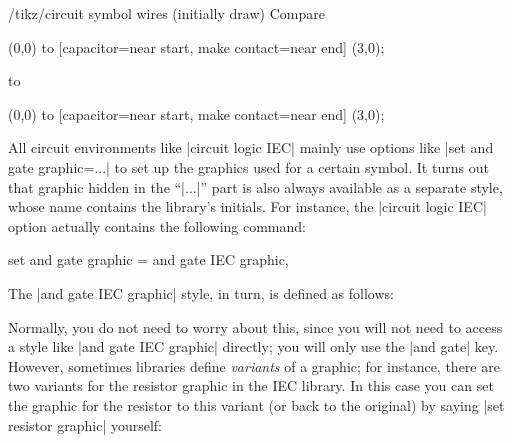 \begin{itemize}
\begin{stylekey}{/tikz/circuit symbol wires (initially draw)}
            Compare
\begin{codeexample}[preamble={\usetikzlibrary{circuits.ee.IEC}}]
\tikz [circuit ee IEC,circuit symbol lines/.style={draw,very thick}]
  \draw (0,0) to [capacitor={near start},
                  make contact={near end}] (3,0);
\end{codeexample}
            to
\begin{codeexample}[preamble={\usetikzlibrary{circuits.ee.IEC}}]
\tikz [circuit ee IEC,circuit symbol wires/.style={draw,very thick}]
  \draw (0,0) to [capacitor={near start},
                  make contact={near end}] (3,0);
\end{codeexample}
        \end{stylekey}
\end{itemize}

All circuit environments like |circuit logic IEC| mainly use options like
|set and gate graphic=...| to set up the graphics used for a certain symbol. It
turns out that graphic hidden in the ``|...|'' part is also always available as
a separate style, whose name contains the library's initials. For instance, the
|circuit logic IEC| option actually contains the following command:
%
\begin{codeexample}
  set and gate graphic = and gate IEC graphic,
\end{codeexample}
%
The |and gate IEC graphic| style, in turn, is defined as follows:
%
\begin{codeexample}
\end{codeexample}

Normally, you do not need to worry about this, since you will not need to
access a style like |and gate IEC graphic| directly; you will only use the
|and gate| key. However, sometimes libraries define \emph{variants} of a
graphic; for instance, there are two variants for the resistor graphic in the
IEC library. In this case you can set the graphic for the resistor to this
variant (or back to the original) by saying |set resistor graphic| yourself:
%
\begin{codeexample}[preamble={\usetikzlibrary{circuits.ee.IEC}}]
\end{codeexample}


